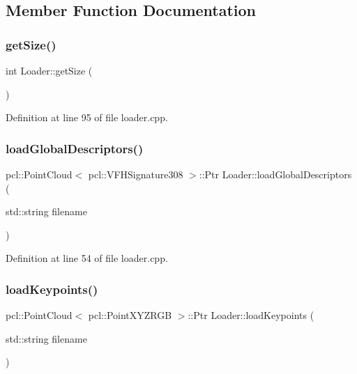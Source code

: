 \subsection{Member Function Documentation}
\hypertarget{class_loader_ac515e4a910ff4db1e3c1173793bb1bba}{}\label{class_loader_ac515e4a910ff4db1e3c1173793bb1bba} 
\subsubsection{\texorpdfstring{get\+Size()}{getSize()}}
{\footnotesize\ttfamily int Loader\+::get\+Size (\begin{DoxyParamCaption}{ }\end{DoxyParamCaption})}



Definition at line 95 of file loader.\+cpp.

\hypertarget{class_loader_acb76649e253a06ab8c5a475d3fbc74a3}{}\label{class_loader_acb76649e253a06ab8c5a475d3fbc74a3} 
\subsubsection{\texorpdfstring{load\+Global\+Descriptors()}{loadGlobalDescriptors()}}
{\footnotesize\ttfamily pcl\+::\+Point\+Cloud$<$ pcl\+::\+V\+F\+H\+Signature308 $>$\+::Ptr Loader\+::load\+Global\+Descriptors (\begin{DoxyParamCaption}\item[{std\+::string}]{filename }\end{DoxyParamCaption})}



Definition at line 54 of file loader.\+cpp.

\hypertarget{class_loader_a8cddb9239ed991e33efab83edd7280f7}{}\label{class_loader_a8cddb9239ed991e33efab83edd7280f7} 
\subsubsection{\texorpdfstring{load\+Keypoints()}{loadKeypoints()}}
{\footnotesize\ttfamily pcl\+::\+Point\+Cloud$<$ pcl\+::\+Point\+X\+Y\+Z\+R\+GB $>$\+::Ptr Loader\+::load\+Keypoints (\begin{DoxyParamCaption}\item[{std\+::string}]{filename }\end{DoxyParamCaption})}



